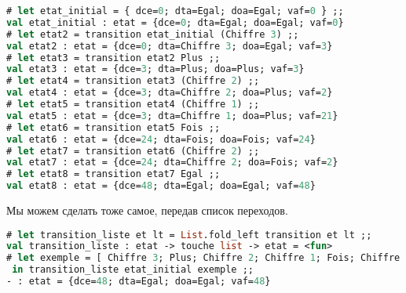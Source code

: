 \begin{lstlisting}[language=OCaml]
# let etat_initial = { dce=0; dta=Egal; doa=Egal; vaf=0 } ;;
val etat_initial : etat = {dce=0; dta=Egal; doa=Egal; vaf=0}
# let etat2 = transition etat_initial (Chiffre 3) ;;
val etat2 : etat = {dce=0; dta=Chiffre 3; doa=Egal; vaf=3}
# let etat3 = transition etat2 Plus ;;
val etat3 : etat = {dce=3; dta=Plus; doa=Plus; vaf=3}
# let etat4 = transition etat3 (Chiffre 2) ;;
val etat4 : etat = {dce=3; dta=Chiffre 2; doa=Plus; vaf=2}
# let etat5 = transition etat4 (Chiffre 1) ;;
val etat5 : etat = {dce=3; dta=Chiffre 1; doa=Plus; vaf=21}
# let etat6 = transition etat5 Fois ;;
val etat6 : etat = {dce=24; dta=Fois; doa=Fois; vaf=24}
# let etat7 = transition etat6 (Chiffre 2) ;;
val etat7 : etat = {dce=24; dta=Chiffre 2; doa=Fois; vaf=2}
# let etat8 = transition etat7 Egal ;;
val etat8 : etat = {dce=48; dta=Egal; doa=Egal; vaf=48}
\end{lstlisting}

Мы можем сделать тоже самое, передав список переходов.

\begin{lstlisting}[language=OCaml]
# let transition_liste et lt = List.fold_left transition et lt ;;
val transition_liste : etat -> touche list -> etat = <fun>
# let exemple = [ Chiffre 3; Plus; Chiffre 2; Chiffre 1; Fois; Chiffre 2; Egal ]
 in transition_liste etat_initial exemple ;;
- : etat = {dce=48; dta=Egal; doa=Egal; vaf=48}
\end{lstlisting}



